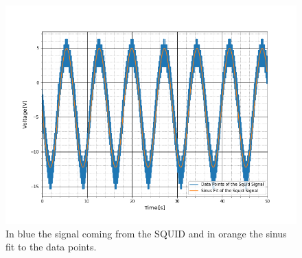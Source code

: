 \begin{figure}[ht]
	\includegraphics[scale=0.5]{Bild/r1_5_2}
	\centering
	\caption[Example of the Data Plots with SInus Fit]{In blue the signal coming from the SQUID and in orange the sinus fit to the data points.}
	\label{Fit1}
\end{figure}
\FloatBarrier
